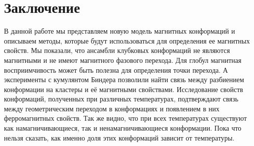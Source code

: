 \section{Заключение}

В данной работе мы представляем новую модель магнитных конформаций и описываем методы, которые будут использоваться для определения ее магнитных свойств. Мы показали, что ансамбли клубковых конформаций не являются магнитными и не имеют магнитного фазового перехода. Для глобул магнитная восприимчивость может быть полезна для определения точки перехода. А эксперименты с кумулянтом Биндера позволили найти связь между разбиением конформации на кластеры и её магнитными свойствами.
Исследование свойств конформаций, полученных при различных температурах, подтверждают связь между геометрическим переходом в конформациях и появлением в них ферромагнитных свойств. Так же видно, что при всех температурах существуют как намагничивающиеся, так и ненамагничивающиеся конформации. Пока что нельзя сказать, как именно доля этих конформаций зависит от температуры.